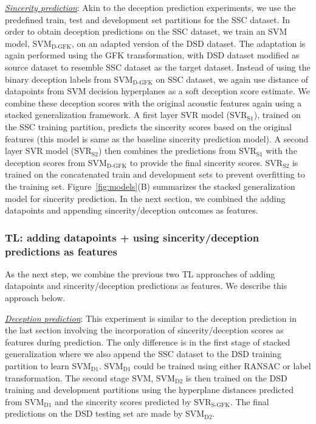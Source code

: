 \documentclass{article}
\begin{document}
\begin{spacing}{0.89}
\underline{\it Sincerity prediction}:
Akin to the deception prediction experiments, we use the predefined train, test and development set partitions for the SSC dataset.
In order to obtain deception predictions on the SSC dataset, we train an SVM model, SVM$_\text{D-GFK}$, on an adapted version of the DSD dataset.
The adaptation is again performed using the GFK transformation, with DSD dataset modified as source dataset to resemble SSC dataset as the target dataset.
Instead of using the binary deception labels from SVM$_\text{D-GFK}$ on SSC dataset, we again use distance of datapoints from SVM decision hyperplanes as a soft deception score estimate. 
We combine these deception scores with the original acoustic features again using a stacked generalization framework. 
A first layer SVR model (SVR$_\text{S1}$), trained on the SSC training partition, predicts the sincerity scores based on the original features (this model is same as the baseline sincerity prediction model). 
A second layer SVR model (SVR$_\text{S2}$) then combines the predictions from SVR$_\text{S1}$ with the deception scores from SVM$_\text{D-GFK}$ to provide the final sincerity scores.  
SVR$_\text{S2}$ is trained on the concatenated train and development sets to prevent overfitting to the training set.
Figure~\ref{fig:models}(B) summarizes the stacked generalization model for sincerity prediction. 
In the next section, we combined the adding datapoints and appending sincerity/deception outcomes as features. 

\vspace{-2mm}
\subsubsection{TL: adding datapoints + using sincerity/deception predictions as features}
\vspace{-2mm}
As the next step, we combine the previous two TL approaches of adding datapoints and sincerity/deception predictions as features.
We describe this approach below.

\underline{\it Deception prediction}: 
This experiment is similar to the deception prediction in the last section involving the incorporation of sincerity/deception scores as features during prediction.
The only difference is in the first stage of stacked generalization where we also append the SSC dataset to the DSD training partition to learn SVM$_\text{D1}$. 
SVM$_\text{D1}$ could be trained using either RANSAC or label transformation.
The second stage SVM, SVM$_\text{D2}$ is then trained on the DSD training and development partitions using the hyperplane distances predicted from SVM$_\text{D1}$ and the sincerity scores predicted by SVR$_\text{S-GFK}$. 
The final predictions on the DSD testing set are made by SVM$_\text{D2}$.


\end{spacing}
\end{document}
